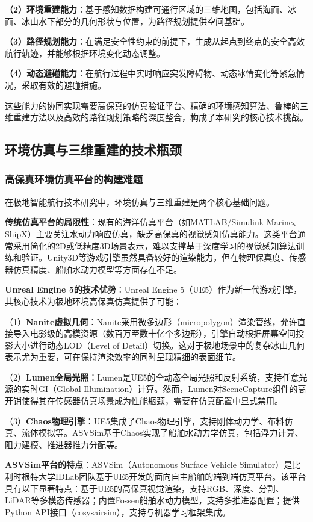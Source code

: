 \documentclass[12pt,a4paper]{ctexbook}
\begin{document}
\textbf{（2）环境重建能力}：基于感知数据构建可通行区域的三维地图，包括海面、冰面、冰山水下部分的几何形状与位置，为路径规划提供空间基础。

\textbf{（3）路径规划能力}：在满足安全性约束的前提下，生成从起点到终点的安全高效航行轨迹，并能够根据环境变化动态调整。

\textbf{（4）动态避碰能力}：在航行过程中实时响应突发障碍物、动态冰情变化等紧急情况，采取有效的避碰措施。

这些能力的协同实现需要高保真的仿真验证平台、精确的环境感知算法、鲁棒的三维重建方法以及高效的路径规划策略的深度整合，构成了本研究的核心技术挑战。

\subsection{环境仿真与三维重建的技术瓶颈}

\subsubsection{高保真环境仿真平台的构建难题}

在极地智能航行技术研究中，环境仿真与三维重建是两个核心基础问题。

\textbf{传统仿真平台的局限性}：现有的海洋仿真平台（如MATLAB/Simulink Marine、ShipX）主要关注水动力响应仿真，缺乏高保真的视觉感知仿真能力。这类平台通常采用简化的2D或低精度3D场景表示，难以支撑基于深度学习的视觉感知算法训练和验证。Unity3D等游戏引擎虽然具备较好的渲染能力，但在物理保真度、传感器仿真精度、船舶水动力模型等方面存在不足。

\textbf{Unreal Engine 5的技术优势}：Unreal Engine 5（UE5）作为新一代游戏引擎，其核心技术为极地环境高保真仿真提供了可能：

（1）\textbf{Nanite虚拟几何}：Nanite采用微多边形（micropolygon）渲染管线，允许直接导入电影级的高模资源（数百万至数十亿个多边形），引擎自动根据屏幕空间投影大小进行动态LOD（Level of Detail）切换。这对于极地场景中的复杂冰山几何表示尤为重要，可在保持渲染效率的同时呈现精细的表面细节。

（2）\textbf{Lumen全局光照}：Lumen是UE5的全动态全局光照和反射系统，支持任意光源的实时GI（Global Illumination）计算。然而，Lumen对SceneCapture组件的高开销使得其在传感器仿真场景成为性能瓶颈，需要在仿真配置中显式禁用。

（3）\textbf{Chaos物理引擎}：UE5集成了Chaos物理引擎，支持刚体动力学、布料仿真、流体模拟等。ASVSim基于Chaos实现了船舶水动力学仿真，包括浮力计算、阻力建模、推进器推力分配等。

\textbf{ASVSim平台的特点}：ASVSim（Autonomous Surface Vehicle Simulator）是比利时根特大学IDLab团队基于UE5开发的面向自主船舶的端到端仿真平台。该平台具有以下显著特点：基于UE5的高保真视觉渲染，支持RGB、深度、分割、LiDAR等多模态传感器；内置Fossen船舶水动力模型，支持多推进器配置；提供Python API接口（cosysairsim），支持与机器学习框架集成。
\end{document}
